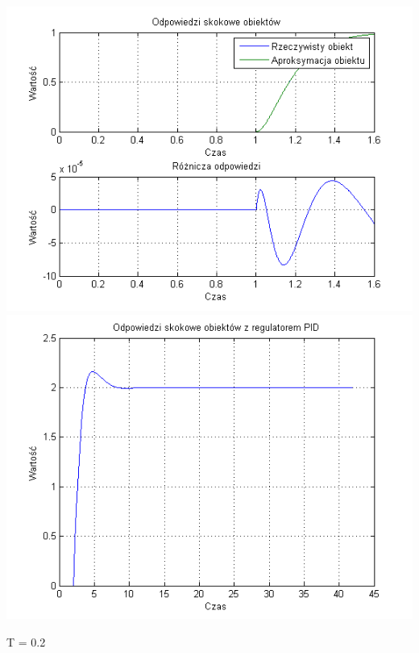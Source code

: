 \documentclass[10pt,a4paper]{article}
\begin{document}
\begin{center}
\includegraphics[scale=1]{images/dwa/skrypt_49.png}\\
\includegraphics[scale=1]{images/dwa/skrypt_50.png}\\
\end{center}
\newpage
T = 0.2
\end{document}
